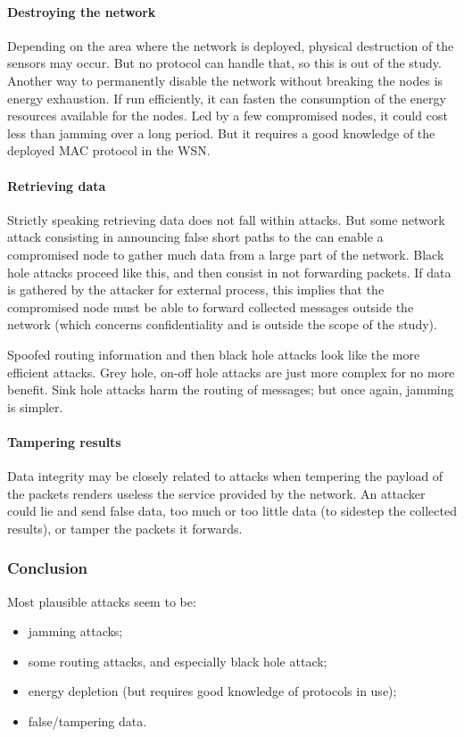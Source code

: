 \paragraph{Destroying the network}
Depending on the area where the network is deployed, physical destruction of the sensors may occur.
But no protocol can handle that, so this is out of the study.
Another way to permanently disable the network without breaking the nodes is energy exhaustion.
If run efficiently, it can fasten the consumption of the energy resources available for the nodes.
Led by a few compromised nodes, it could cost less than jamming over a long period.
But it requires a good knowledge of the deployed MAC protocol in the WSN.

\paragraph{Retrieving data}
Strictly speaking retrieving data does not fall within \dos attacks.
But some network attack consisting in announcing false short paths to the \bs can enable a compromised node to gather much data from a large part of the network.
Black hole attacks proceed like this, and then consist in not forwarding packets.
If data is gathered by the attacker for external process, this implies that the compromised node must be able to forward collected messages outside the network (which concerns confidentiality and is outside the scope of the study).

Spoofed routing information and then black hole attacks look like the more efficient attacks.
Grey hole, on-off hole attacks are just more complex for no more benefit.
Sink hole attacks harm the routing of messages; but once again, jamming is simpler.

\paragraph{Tampering results}
Data integrity may be closely related to \dos attacks when tempering the payload of the packets renders useless the service provided by the network.
An attacker could lie and send false data, too much or too little data (to sidestep the collected results), or tamper the packets it forwards.


\subsubsection{Conclusion}

Most plausible attacks seem to be:
\begin{itemize}
	\item jamming attacks;
	\item some routing attacks, and especially black hole attack;
	\item energy depletion (but requires good knowledge of protocols in use);
	\item false/tampering data.
\end{itemize}

